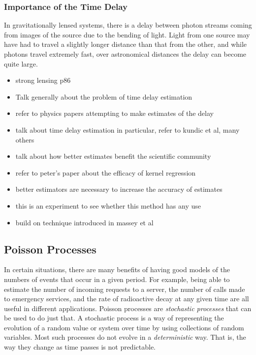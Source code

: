 \documentclass[a4paper,11pt]{article}
\begin{document}
\subsubsection{Importance of the Time Delay}
\label{sec-2-1-1}

In gravitationally lensed systems, there is a delay between photon streams
coming from images of the source due to the bending of light. Light from one
source may have had to travel a slightly longer distance than that from the
other, and while photons travel extremely fast, over astronomical distances the
delay can become quite large. 
\begin{itemize}
\item strong lensing p86
\item Talk generally about the problem of time delay estimation
\item refer to physics papers attempting to make estimates of the delay
\item talk about time delay estimation in particular, refer to kundic et al, many others
\item talk about how better estimates benefit the scientific community
\item refer to peter's paper about the efficacy of kernel regression
\item better estimators are necessary to increase the accuracy of estimates
\item this is an experiment to see whether this method has any use
\item build on technique introduced in massey et al
\end{itemize}
\subsection{Poisson Processes}
\label{sec-2-2}

In certain situations, there are many benefits of having good models of the
numbers of events that occur in a given period. For example, being able to
estimate the number of incoming requests to a server, the number of calls made
to emergency services, and the rate of radioactive decay at any given time are
all useful in different applications. Poisson processes are \emph{stochastic
processes} that can be used to do just that. A stochastic process is a way of
representing the evolution of a random value or system over time by using
collections of random variables. Most such processes do not evolve in a
\emph{deterministic} way. That is, the way they change as time passes is not
predictable.
\end{document}
